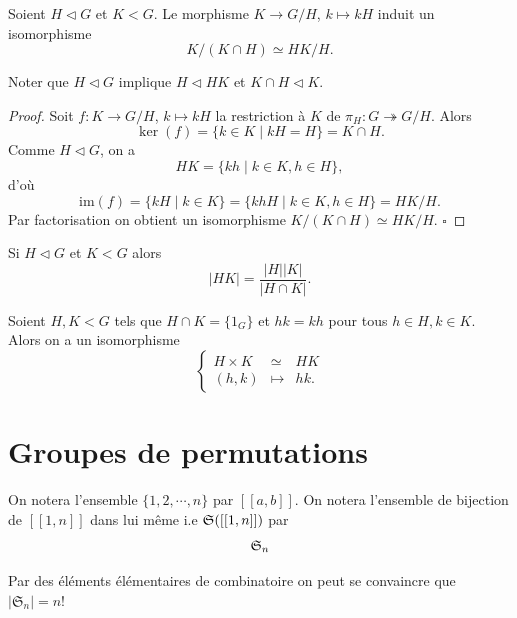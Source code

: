  \begin{proposition}
        Soient \( H \triangleleft G \) et \( K < G \). Le morphisme \( K \to G/H \),  
\( k \mapsto kH \) induit un isomorphisme
\[
K / (K \cap H) \simeq HK / H.
\]
    \end{proposition}

Noter que \( H \triangleleft G \) implique \( H \triangleleft HK \) et \( K \cap H \triangleleft K \). 
\begin{proof}
    Soit \( f : K \to G/H \), \( k \mapsto kH \) la restriction à \( K \) de \( \pi_H : G \twoheadrightarrow G/H \).  
Alors 
\[
\ker(f) = \{ k \in K \mid kH = H \} = K \cap H.
\]
Comme \( H \triangleleft G \), on a  
\[
HK = \{ kh \mid k \in K, h \in H \},
\]
d'où  
\[
\text{im}(f) = \{ kH \mid k \in K \} = \{ khH \mid k \in K, h \in H \} = HK/H.
\]
Par factorisation on obtient un isomorphisme \( K / (K \cap H) \simeq HK / H \). \(\square\)
\end{proof}

  \begin{corollaire}
        Si \( H \triangleleft G \) et \( K < G \) alors
\[
|HK| = \frac{|H| |K|}{|H \cap K|}.
\]
    \end{corollaire}

\begin{proposition}
        Soient \( H, K < G \) tels que \( H \cap K = \{ 1_G \} \) et \( hk = kh \) pour tous \( h \in H, k \in K \). Alors on a un isomorphisme
\[
\left\{
\begin{array}{ccc}
H \times K & \simeq & HK \\
(h, k) & \mapsto & hk.
\end{array}
\right.
\]
\end{proposition}

\section{Groupes de permutations}

\begin{notation}
    On notera l'ensemble $\{1,2,\cdots,n\}$ par $[[a,b]]$. On notera l’ensemble de bijection de $[[1,n]]$ dans lui même i.e $\mathfrak{S}([[1,n]])$ par
    \[
    \mathfrak{S}_n
    \]
\end{notation}

\begin{remarque}
    Par des éléments élémentaires de combinatoire on peut se convaincre que $|\mathfrak{S}_n|=n!$
\end{remarque}

